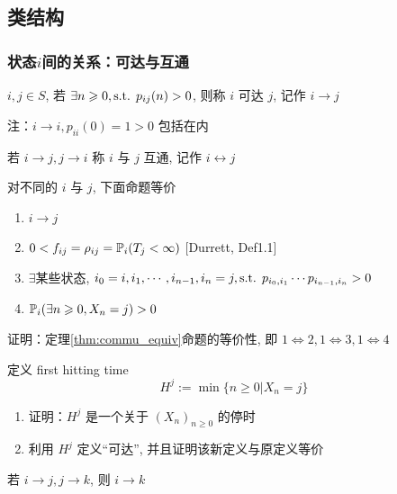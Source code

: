 \newpage
\subsection{类结构}
\subsubsection{状态$i$间的关系：可达与互通}

\begin{definition}[可达]
    $i,j\in S$, 若 $\exists n\geqslant 0,\text{s.t. } p_{ij}(n)>0$, 则称 $i$ 可达 $j$, 记作 $i\to j$

    注：$i\to i,p_{ii}(0)=1>0$ 包括在内
\end{definition}

\begin{definition}[互通]
    若 $i\to j,j\to i$ 称 $i$ 与 $j$ 互通, 记作 $i\leftrightarrow j$
\end{definition}

\begin{theorem}\label{thm:commu_equiv}
    对不同的 $i$ 与 $j$, 下面命题等价
    \begin{enumerate}
        \item $i\to j$
        \item $0<f_{ij}=\rho_{ij}=\mathbb{P}_i(T_j<\infty)$ [Durrett\cite{durrett}, Def1.1]
        \item $\exists$某些状态, $i_0=i,i_1,\cdots,i_{n-1},i_n=j,\text{s.t. } p_{i_0,i_1}\cdots p_{i_{n-1},i_n}>0$
        \item $\mathbb{P}_i(\exists n\geqslant 0,X_n=j)>0$
    \end{enumerate}
\end{theorem}

\begin{problem}[作业6-1]
    证明：定理\ref{thm:commu_equiv}命题的等价性, 即 $1\Leftrightarrow 2,1\Leftrightarrow 3, 1\Leftrightarrow 4$
\end{problem}

\begin{problem}[作业6-2]
    定义 first hitting time
    \[
    H^j:=\min\{n\geq 0|X_n=j\}
    \]
    \begin{enumerate}
        \item 证明：$H^j$ 是一个关于 $(X_n)_{n\geq 0}$ 的停时
        \item 利用 $H^j$ 定义“可达”, 并且证明该新定义与原定义等价
    \end{enumerate}
\end{problem}

\begin{property}
    若 $i\to j,j\to k$, 则 $i\to k$
\end{property}

